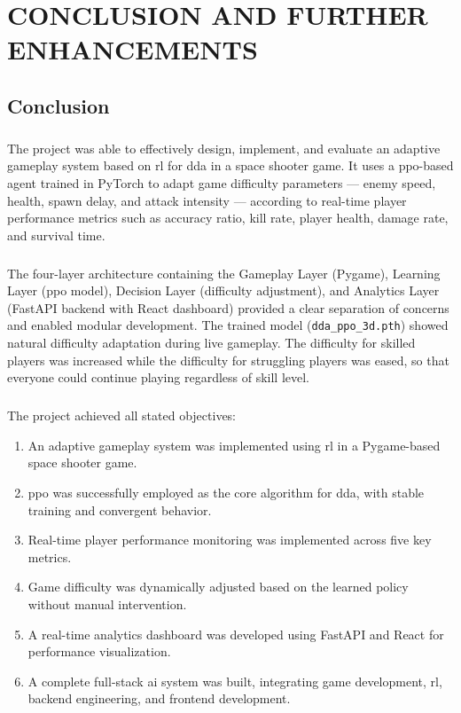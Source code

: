 \chapter{\MakeUppercase{Conclusion and Further enhancements}}

\section{Conclusion}
\paragraph{} The project was able to effectively design, implement, and evaluate an adaptive gameplay system based on \ac{rl} for \ac{dda} in a space shooter game. It uses a \ac{ppo}-based agent trained in PyTorch to adapt game difficulty parameters --- enemy speed, health, spawn delay, and attack intensity --- according to real-time player performance metrics such as accuracy ratio, kill rate, player health, damage rate, and survival time.

\paragraph{} \sloppy The four-layer architecture containing the Gameplay Layer (Pygame), Learning Layer (\ac{ppo} model), Decision Layer (difficulty adjustment), and Analytics Layer (FastAPI backend with React dashboard) provided a clear separation of concerns and enabled modular development. The trained model (\texttt{dda\_ppo\_3d.pth}) showed natural difficulty adaptation during live gameplay. The difficulty for skilled players was increased while the difficulty for struggling players was eased, so that everyone could continue playing regardless of skill level. \fussy

\paragraph{} The project achieved all stated objectives:

\begin{enumerate}
	\item An adaptive gameplay system was implemented using \ac{rl} in a Pygame-based space shooter game.
	\item \ac{ppo} was successfully employed as the core algorithm for \ac{dda}, with stable training and convergent behavior.
	\item Real-time player performance monitoring was implemented across five key metrics.
	\item Game difficulty was dynamically adjusted based on the learned policy without manual intervention.
	\item A real-time analytics dashboard was developed using FastAPI and React for performance visualization.
	\item A complete full-stack \ac{ai} system was built, integrating game development, \ac{rl}, backend engineering, and frontend development.
\end{enumerate}

